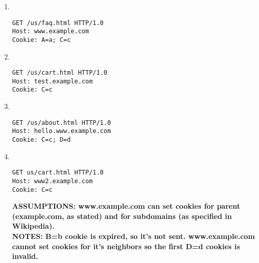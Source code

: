 \documentclass{report}
\begin{document}
\begin{problem}
\begin{enumerate}
\item \ {}
\begin{lstlisting}
GET /us/faq.html HTTP/1.0
Host: www.example.com
Cookie: A=a; C=c
\end{lstlisting}

\item \ {}
\begin{lstlisting}
GET /us/cart.html HTTP/1.0
Host: test.example.com
Cookie: C=c
\end{lstlisting}

\item \ {}
\begin{lstlisting}
GET /us/about.html HTTP/1.0
Host: hello.www.example.com
Cookie: C=c; D=d
\end{lstlisting}

\item \ {}
\begin{lstlisting}
GET us/cart.html HTTP/1.0
Host: www2.example.com
Cookie: C=c
\end{lstlisting}

\textbf{
ASSUMPTIONS: www.example.com can set cookies for parent (example.com, as stated)
and for subdomains (as specified in Wikipedia).\\
NOTES: B=b cookie is expired, so it's not sent. www.example.com cannot set
cookies for it's neighbors so the first D=d cookies is invalid.
}
\end{enumerate}


\end{problem}
\end{document}

